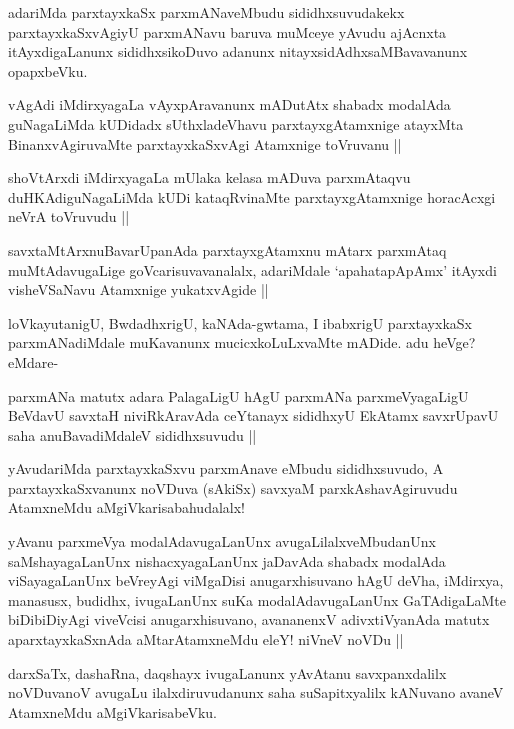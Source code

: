 \begin{artha}
adariMda parxtayxkaSx parxmANaveMbudu sididhxsuvudakekx parxtayxkaSxvAgiyU parxmANavu baruva muMceye yAvudu ajAcnxta itAyxdigaLanunx sididhxsikoDuvo adanunx nitayxsidAdhxsaMBavavanunx  opapxbeVku.
\end{artha}

\begin{artha}
vAgAdi iMdirxyagaLa vAyxpAravanunx mADutAtx shabadx modalAda guNagaLiMda kUDidadx sUthxladeVhavu parxtayxgAtamxnige atayxMta BinanxvAgiruvaMte parxtayxkaSxvAgi Atamxnige toVruvanu ||
\end{artha}

\begin{artha}
shoVtArxdi iMdirxyagaLa mUlaka kelasa mADuva parxmAtaqvu duHKAdiguNagaLiMda kUDi kataqRvinaMte parxtayxgAtamxnige horacAcxgi neVrA toVruvudu ||
\end{artha}

\begin{artha}
savxtaMtArxnuBavarUpanAda parxtayxgAtamxnu mAtarx parxmAtaq muMtAdavugaLige goVcarisuvavanalalx, adariMdale `apahatapApAmx' itAyxdi visheVSaNavu Atamxnige yukatxvAgide ||
\end{artha}

\begin{artha}
loVkayutanigU, BwdadhxrigU, kaNAda-gwtama, I ibabxrigU parxtayxkaSx parxmANadiMdale muKavanunx mucicxkoLuLxvaMte mADide. adu heVge? eMdare-
\end{artha}

\begin{artha}
parxmANa matutx adara PalagaLigU hAgU parxmANa parxmeVyagaLigU BeVdavU savxtaH niviRkAravAda ceYtanayx sididhxyU EkAtamx savxrUpavU saha anuBavadiMdaleV sididhxsuvudu ||
\end{artha}

\begin{artha}
yAvudariMda parxtayxkaSxvu parxmAnave eMbudu sididhxsuvudo, A parxtayxkaSxvanunx noVDuva (sAkiSx) savxyaM parxkAshavAgiruvudu AtamxneMdu aMgiVkarisabahudalalx!
\end{artha}

\begin{artha}
yAvanu parxmeVya modalAdavugaLanUnx avugaLilalxveMbudanUnx saMshayagaLanUnx nishacxyagaLanUnx jaDavAda shabadx modalAda viSayagaLanUnx beVreyAgi viMgaDisi anugarxhisuvano hAgU deVha, iMdirxya, manasusx, budidhx, ivugaLanUnx suKa modalAdavugaLanUnx GaTAdigaLaMte biDibiDiyAgi viveVcisi anugarxhisuvano, avananenxV adivxtiVyanAda matutx aparxtayxkaSxnAda aMtarAtamxneMdu eleY! niVneV noVDu ||
\end{artha}

\begin{artha}
darxSaTx, dashaRna, daqshayx ivugaLanunx yAvAtanu savxpanxdalilx noVDuvanoV avugaLu ilalxdiruvudanunx saha suSapitxyalilx kANuvano avaneV AtamxneMdu aMgiVkarisabeVku.
\end{artha}

